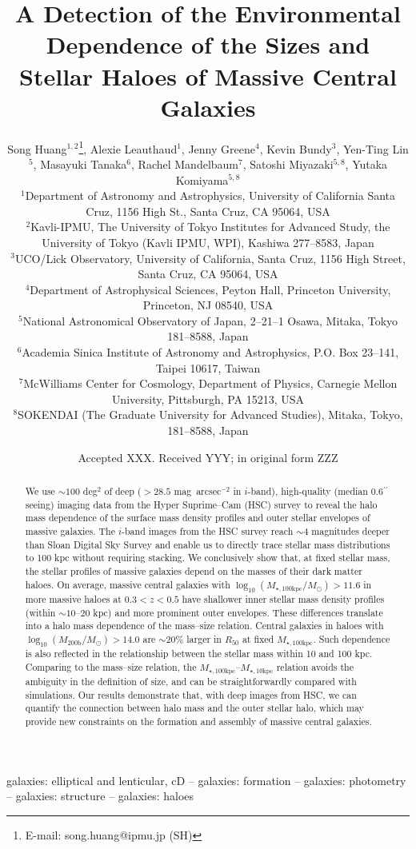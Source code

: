 \documentclass[a4paper,fleqn,usenatbib]{mnras}
\title[Structure and Environment of Massive Galaxies]{
       A Detection of the Environmental Dependence of the Sizes and Stellar Haloes
       of Massive Central Galaxies}
\author[S. Huang et al.]{
        Song Huang$^{1,2}$\thanks{E-mail: song.huang@ipmu.jp (SH)},
        Alexie Leauthaud$^{1}$,
        Jenny Greene$^{4}$,
        Kevin Bundy$^{3}$,
        \newauthor
        Yen-Ting Lin$^{5}$,
        Masayuki Tanaka$^{6}$,
        Rachel Mandelbaum$^{7}$,
        Satoshi Miyazaki$^{5,8}$,
        \newauthor
        Yutaka Komiyama$^{5,8}$
        \\
        $^{1}$Department of Astronomy and Astrophysics, University of California 
              Santa Cruz, 1156 High St., Santa Cruz, CA 95064, USA\\
        $^{2}$Kavli-IPMU, The University of Tokyo Institutes for Advanced Study, 
              the University of Tokyo (Kavli IPMU, WPI), Kashiwa 277--8583, Japan\\              
        $^{3}$UCO/Lick Observatory, University of California, Santa Cruz,
              1156 High Street, Santa Cruz, CA 95064, USA\\
        $^{4}$Department of Astrophysical Sciences, Peyton Hall,
              Princeton University, Princeton, NJ 08540, USA \\
        $^{5}$National Astronomical Observatory of Japan, 2--21--1 Osawa, Mitaka, 
              Tokyo 181--8588, Japan\\
        $^{6}$Academia Sinica Institute of Astronomy and Astrophysics, 
              P.O. Box 23--141, Taipei 10617, Taiwan\\
        $^{7}$McWilliams Center for Cosmology, Department of Physics, 
              Carnegie Mellon University, Pittsburgh, PA 15213, USA\\
        $^{8}$SOKENDAI (The Graduate University for Advanced Studies), Mitaka,
              Tokyo, 181--8588, Japan
        }
\date{Accepted XXX. Received YYY; in original form ZZZ}
\def\asec{$^{\prime\prime}$}
\def\sb{mag~arcsec$^{-2}$}
\def\logmh{{$\log_{10} (M_{\mathrm{200b}}/M_{\odot})$}}
\def\minn{{$M_{\star,10\mathrm{kpc}}$}}
\def\mtot{{$M_{\star,100\mathrm{kpc}}$}}
\def\logmtot{{$\log_{10} (M_{\star,100\mathrm{kpc}}/M_{\odot})$}}
\begin{document}
\label{firstpage}
\pagerange{\pageref{firstpage}--\pageref{lastpage}}

\maketitle


\begin{abstract}
  
    We use ${\sim}100$ deg$^2$ of deep ($>28.5$ \sb{} in $i$-band), high-quality 
    (median 0.6\asec seeing) imaging data from the Hyper Suprime--Cam (HSC) survey to 
    reveal the halo mass dependence of the surface mass density profiles and outer 
    stellar envelopes of massive galaxies. 
    The $i$-band images from the HSC survey reach ${\sim}4$ magnitudes deeper than 
    Sloan Digital Sky Survey and enable us to directly trace stellar mass distributions 
    to 100 kpc without requiring stacking.  
    We conclusively show that, at fixed stellar mass, the stellar profiles of massive 
    galaxies depend on the masses of their dark matter haloes. 
    On average, massive central galaxies with \logmtot{}$>11.6$ in more massive haloes 
    at $0.3 < z < 0.5$ have shallower inner stellar mass density profiles 
    (within ${\sim}10$--$20$ kpc) and more prominent outer envelopes. 
    These differences translate into a halo mass dependence of the mass--size relation. 
    Central galaxies in haloes with \logmh{}$>14.0$ are $\sim 20$\% larger in 
    $R_{\mathrm{50}}$ at fixed \mtot{}. 
    Such dependence is also reflected in the relationship between the stellar mass 
    within 10 and 100 kpc.  
    Comparing to the mass--size relation, the \mtot{}--\minn{} relation avoids the 
    ambiguity in the definition of size, and can be straightforwardly compared with 
    simulations. 
    Our results demonstrate that, with deep images from HSC, we can quantify the 
    connection between halo mass and the outer stellar halo, which may provide new 
    constraints on the formation and assembly of massive central galaxies.
    
\end{abstract}

\begin{keywords}
    galaxies: elliptical and lenticular, cD --
    galaxies: formation --
    galaxies: photometry -- 
    galaxies: structure -- 
    galaxies: haloes
\end{keywords}
\end{document}
